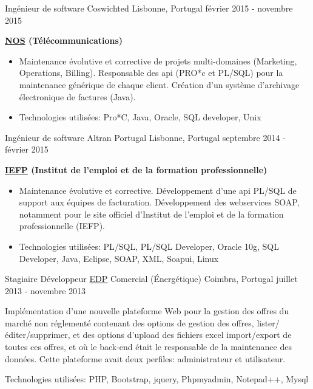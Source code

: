 \begin{cventries}

\cventry
{Ingénieur de software} %
{Coswichted} %
{Lisbonne, Portugal} %
{février 2015 - novembre 2015} %
{ %
\begin{cvitems}
\item { \textbf{\href{https://www.nos.pt/}{NOS} (Télécommunications)}}
\begin{itemize}
\item {Maintenance évolutive et corrective de projets multi-domaines (Marketing, Operations, Billing). 
Responsable des api (PRO*c et PL/SQL) pour la maintenance générique de chaque client. Création d'un système d'archivage électronique de factures (Java).}
\item {Technologies utilisées: Pro*C, Java, Oracle, SQL developer, Unix}
\end{itemize}
\end{cvitems}
}


\cventry
{Ingénieur de software} %
{Altran Portugal} %
{Lisbonne, Portugal} %
{septembre 2014 - février 2015} %
{ %
\begin{cvitems}
\item { \textbf{\href{https://www.iefp.pt/}{IEFP} (Institut de l'emploi et de la formation professionnelle)}}
\begin{itemize}
\item {Maintenance évolutive et corrective. Développement d’une api PL/SQL de support aux équipes de facturation. Développement des webservices SOAP, notamment pour le site officiel d'Institut de l'emploi et de la formation professionnelle (IEFP).}
\item{Technologies utilisées: PL/SQL, PL/SQL Developer, Oracle 10g, SQL Developer, Java, Eclipse, SOAP, XML, Soapui, Linux}
\end{itemize}
\end{cvitems} 
}


\cventry
{Stagiaire Développeur} %
{\href{http://www.edp.pt/pt/Pages/homepage.aspx}{EDP} Comercial (Énergétique)} %
{Coimbra, Portugal} %
{juillet 2013 - novembre 2013} %
{ %
\begin{cvitems}
\item {Implémentation d'une nouvelle plateforme Web pour la gestion des offres du marché non réglementé contenant des options de gestion des offres, lister/éditer/supprimer, et des options d'upload des fichiers excel import/export de toutes ces offres, et où le back-end  était le responsable de la maintenance des données. Cette plateforme avait deux perfiles: administrateur et utilisateur.}
\item{Technologies utilisées: PHP, Bootstrap, jquery, Phpmyadmin, Notepad++, Mysql}
\end{cvitems}
}


\end{cventries}
